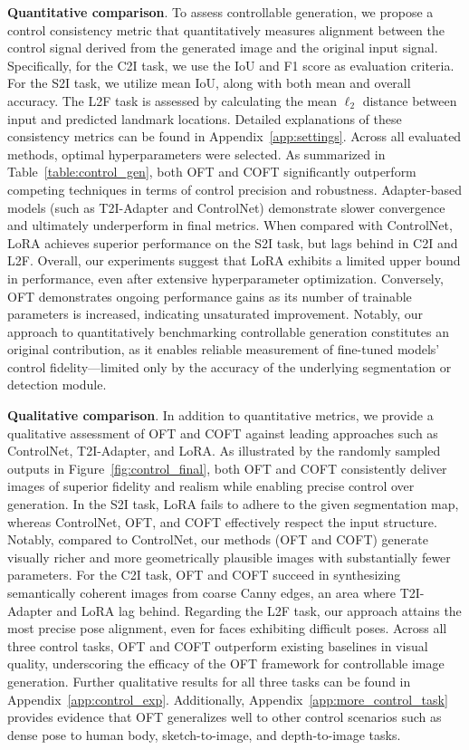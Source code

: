 \textbf{Quantitative comparison}. To assess controllable generation, we propose a control consistency metric that quantitatively measures alignment between the control signal derived from the generated image and the original input signal. Specifically, for the C2I task, we use the IoU and F1 score as evaluation criteria. For the S2I task, we utilize mean IoU, along with both mean and overall accuracy. The L2F task is assessed by calculating the mean $\ell_2$ distance between input and predicted landmark locations. Detailed explanations of these consistency metrics can be found in Appendix~\ref{app:settings}. Across all evaluated methods, optimal hyperparameters were selected. As summarized in Table~\ref{table:control_gen}, both OFT and COFT significantly outperform competing techniques in terms of control precision and robustness. Adapter-based models (such as T2I-Adapter and ControlNet) demonstrate slower convergence and ultimately underperform in final metrics. When compared with ControlNet, LoRA achieves superior performance on the S2I task, but lags behind in C2I and L2F. Overall, our experiments suggest that LoRA exhibits a limited upper bound in performance, even after extensive hyperparameter optimization. Conversely, OFT demonstrates ongoing performance gains as its number of trainable parameters is increased, indicating unsaturated improvement. Notably, our approach to quantitatively benchmarking controllable generation constitutes an original contribution, as it enables reliable measurement of fine-tuned models’ control fidelity—limited only by the accuracy of the underlying segmentation or detection module.

\textbf{Qualitative comparison}. In addition to quantitative metrics, we provide a qualitative assessment of OFT and COFT against leading approaches such as ControlNet, T2I-Adapter, and LoRA. As illustrated by the randomly sampled outputs in Figure~\ref{fig:control_final}, both OFT and COFT consistently deliver images of superior fidelity and realism while enabling precise control over generation. In the S2I task, LoRA fails to adhere to the given segmentation map, whereas ControlNet, OFT, and COFT effectively respect the input structure. Notably, compared to ControlNet, our methods (OFT and COFT) generate visually richer and more geometrically plausible images with substantially fewer parameters. For the C2I task, OFT and COFT succeed in synthesizing semantically coherent images from coarse Canny edges, an area where T2I-Adapter and LoRA lag behind. Regarding the L2F task, our approach attains the most precise pose alignment, even for faces exhibiting difficult poses. Across all three control tasks, OFT and COFT outperform existing baselines in visual quality, underscoring the efficacy of the OFT framework for controllable image generation. Further qualitative results for all three tasks can be found in Appendix~\ref{app:control_exp}. Additionally, Appendix~\ref{app:more_control_task} provides evidence that OFT generalizes well to other control scenarios such as dense pose to human body, sketch-to-image, and depth-to-image tasks.

